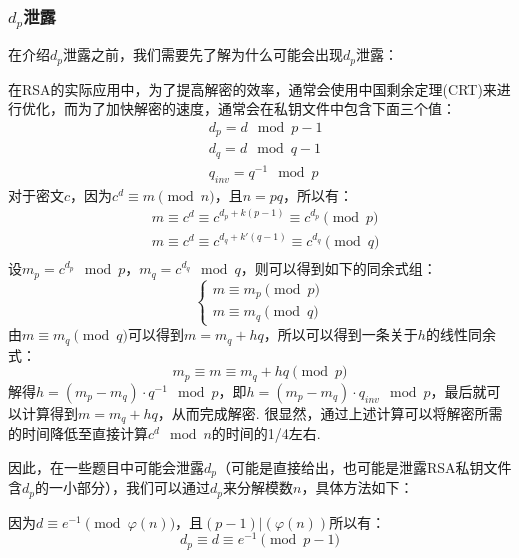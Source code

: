 \documentclass{book}
\numberwithin{equation}{subsubsection}
\begin{document}
\subsubsection{$d_p$泄露}
在介绍$d_p$泄露之前，我们需要先了解为什么可能会出现$d_p$泄露：\par
在RSA的实际应用中，为了提高解密的效率，通常会使用中国剩余定理(CRT)来进行优化，而为了加快解密的速度，通常会在私钥文件中包含下面三个值：
\begin{equation}
    \begin{aligned}
        &d_p= d\mod{p-1}\\
        &d_q= d\mod{q-1}\\
        &q_{inv}= q^{-1}\mod{p}
    \end{aligned}
    \nonumber
\end{equation}
对于密文$c$，因为$c^{d}\equiv m\pmod{n}$，且$n=pq$，所以有：
\begin{equation}
    \begin{aligned}
        &m\equiv c^{d}\equiv c^{d_p+k(p-1)}\equiv c^{d_p}\pmod{p}\\
        &m\equiv c^{d}\equiv c^{d_q+k'(q-1)}\equiv c^{d_q}\pmod{q}\\
    \end{aligned}
    \nonumber
\end{equation}
设$m_p=c^{d_p}\mod{p}$，$m_q=c^{d_q}\mod{q}$，则可以得到如下的同余式组：
\begin{equation}
    \begin{cases}
        m\equiv m_p\pmod{p}\\
        m\equiv m_q\pmod{q}
    \end{cases}
    \nonumber
\end{equation}
由$m\equiv m_q\pmod{q}$可以得到$m=m_q+hq$，所以可以得到一条关于$h$的线性同余式：
\begin{equation}
    m_p\equiv m \equiv m_q+hq\pmod{p}
    \nonumber
\end{equation}
解得$h=(m_p-m_q)\cdot q^{-1}\mod{p}$，即$h=(m_p-m_q)\cdot q_{inv}\mod{p}$，最后就可以计算得到$m=m_q+hq$，从而完成解密.
很显然，通过上述计算可以将解密所需的时间降低至直接计算$c^d\mod{n}$的时间的1/4左右.\par
因此，在一些题目中可能会泄露$d_p$（可能是直接给出，也可能是泄露RSA私钥文件含$d_p$的一小部分），我们可以通过$d_p$来分解模数$n$，具体方法如下：\par
因为$d\equiv e^{-1}\pmod{\varphi(n)}$，且$(p-1)|(\varphi(n))$所以有：
\begin{equation}
    d_p\equiv d\equiv e^{-1}\pmod{p-1}
    \nonumber
\end{equation}
\end{document}
